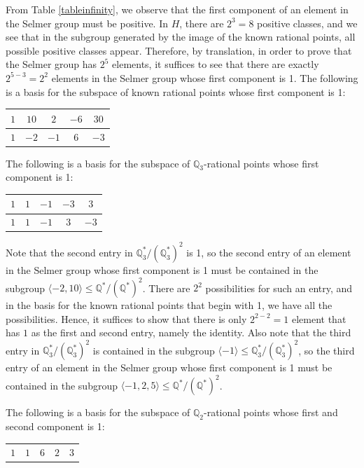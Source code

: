 \documentclass[a4paper, 12pt]{amsart}
\theoremstyle{definition}
\theoremstyle{plain}
\theoremstyle{plain}
\theoremstyle{plain}
\theoremstyle{plain}
\theoremstyle{remark}
\theoremstyle{remark}
\theoremstyle{plain}
\newcommand{\Q}{\mathbb{Q}}
\begin{document}
From Table \ref{tableinfinity}, we observe that the first component of an element in the Selmer group must be positive. In $H$, there are $2^3=8$ positive classes, and we see that in the subgroup generated by the image of the known rational points, all possible positive classes appear. Therefore, by translation, in order to prove that the Selmer group has $2^5$ elements, it suffices to see that there are exactly $2^{5-3}=2^2$ elements in the Selmer group whose first component is 1. The following is a basis for the subspace of known rational points whose first component is 1:

{
	\centering
	\begin{tabular}{c c c c c}
		$1$ & $10$ & $2$ & $-6$ & $30$\\ \hline
		$1$ & $-2$ & $-1$ & $6$ & $-3$
	\end{tabular}\par
}
\hfill \break

The following is a basis for the subspace of $\Q_3$-rational points whose first component is 1:

{
	\centering
	\begin{tabular}{c c c c c}
		$1$ & $1$ & $-1$ & $-3$ & $3$\\ \hline
		$1$ & $1$ & $-1$ & $3$ & $-3$
	\end{tabular}\par
}
\hfill \break

Note that the second entry in $\Q_3^*/(\Q_3^*)^2$ is 1, so the second entry of an element in the Selmer group whose first component is 1 must be contained in the subgroup $\langle -2,10\rangle\le \Q^*/(\Q^*)^2$. There are $2^2$ possibilities for such an entry, and in the basis for the known rational points that begin with 1, we have all the possibilities. Hence, it suffices to show that there is only $2^{2-2}=1$ element that has $1$ as the first and second entry, namely the identity. Also note that the third entry in $\Q_3^*/(\Q_3^*)^2$ is contained in the subgroup $\langle -1\rangle\le\Q_3^*/(\Q_3^*)^2$, so the third entry of an element in the Selmer group whose first component is 1 must be contained in the subgroup $\langle -1,2,5\rangle\le \Q^*/(\Q^*)^2$.

The following is a basis for the subspace of $\Q_2$-rational points whose first and second component is 1:

{
	\centering
	\begin{tabular}{c c c c c}
		$1$ & $1$ & $6$ & $2$ & $3$
	\end{tabular}\par
}
\hfill\break
\end{document}
